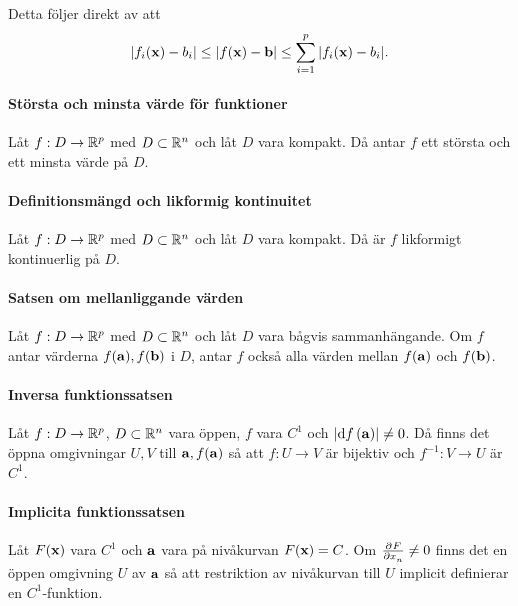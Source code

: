 \proof
Detta följer direkt av att
\begin{align*}
	\abs{f_i(\vect{x}) - b_i}\leq\abs{f(\vect{x}) - \vect{b}}\leq\sum\limits_{i = 1}^{p}\abs{f_i(\vect{x}) - b_i}.
\end{align*}

\paragraph{Största och minsta värde för funktioner}
Låt $f: D\to\mathbb{R}^p$ med $D\subset\mathbb{R}^n$ och låt $D$ vara kompakt. Då antar $f$ ett största och ett minsta värde på $D$.

\proof

\paragraph{Definitionsmängd och likformig kontinuitet}
Låt $f: D\to\mathbb{R}^p$ med $D\subset\mathbb{R}^n$ och låt $D$ vara kompakt. Då är $f$ likformigt kontinuerlig på $D$.

\proof

\paragraph{Satsen om mellanliggande värden}
Låt $f: D\to\mathbb{R}^p$ med $D\subset\mathbb{R}^n$ och låt $D$ vara bågvis sammanhängande. Om $f$ antar värderna $f(\vect{a}), f(\vect{b})$ i $D$, antar $f$ också alla värden mellan $f(\vect{a})$ och $f(\vect{b})$.

\proof

\paragraph{Inversa funktionssatsen}
Låt $f: D\to\mathbb{R}^p$, $D\subset\mathbb{R}^n$ vara öppen, $f$ vara $C^1$ och $\abs{\dd{f} (\vect{a})}\neq 0$. Då finns det öppna omgivningar $U, V$ till $\vect{a}, f(\vect{a})$ så att $f:U\to V$ är bijektiv och $f^{-1}: V\to U$ är $C^1$.

\proof

\paragraph{Implicita funktionssatsen}
Låt $F(\vect{x})$ vara $C^1$ och $\vect{a}$ vara på nivåkurvan $F(\vect{x}) = C$. Om $\pdeval{F}{x_n}{\vect{a}}\neq 0$ finns det en öppen omgivning $U$ av $\vect{a}$ så att restriktion av nivåkurvan till $U$ implicit definierar en $C^1$-funktion.

